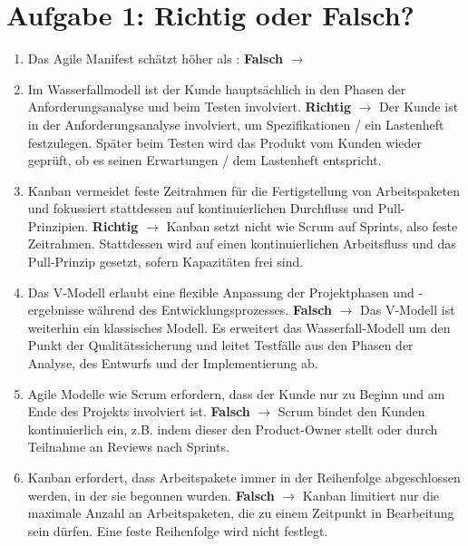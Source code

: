 \section*{Aufgabe 1: Richtig oder Falsch?}

\begin{enumerate}
\item Das Agile Manifest schätzt  höher als
:
\newline \textbf{Falsch} $\rightarrow$ 

\item Im Wasserfallmodell ist der Kunde hauptsächlich in den Phasen
der Anforderungsanalyse und beim Testen involviert.
\newline \textbf{Richtig} $\rightarrow$ Der Kunde ist in der Anforderungsanalyse involviert, um Spezifikationen / ein Lastenheft festzulegen. Später beim Testen wird das Produkt vom Kunden wieder geprüft, ob es seinen Erwartungen / dem Lastenheft entspricht.

\item Kanban vermeidet feste Zeitrahmen für die Fertigstellung von
Arbeitspaketen und fokussiert stattdessen auf kontinuierlichen
Durchfluss und Pull-Prinzipien.
\newline \textbf{Richtig} $\rightarrow$ Kanban setzt nicht wie Scrum auf Sprints, also feste Zeitrahmen. Stattdessen wird auf einen kontinuierlichen Arbeitsfluss und das Pull-Prinzip gesetzt, sofern Kapazitäten frei sind.

\item Das V-Modell erlaubt eine flexible Anpassung der Projektphasen
und -ergebnisse während des Entwicklungsprozesses.
\newline \textbf{Falsch} $\rightarrow$ Das V-Modell ist weiterhin ein klassisches Modell. Es erweitert das Wasserfall-Modell um den Punkt der Qualitätssicherung und leitet Testfälle aus den Phasen der Analyse, des Entwurfs und der Implementierung ab.

\item Agile Modelle wie Scrum erfordern, dass der Kunde nur zu
Beginn und am Ende des Projekts involviert ist.
\newline \textbf{Falsch} $\rightarrow$ Scrum bindet den Kunden kontinuierlich ein, z.B. indem dieser den Product-Owner stellt oder durch Teilnahme an Reviews nach Sprints.

\item Kanban erfordert, dass Arbeitspakete immer in der Reihenfolge
abgeschlossen werden, in der sie begonnen wurden.
\newline \textbf{Falsch} $\rightarrow$ Kanban limitiert nur die maximale Anzahl an Arbeitspaketen, die zu einem Zeitpunkt in Bearbeitung sein dürfen. Eine feste Reihenfolge wird nicht festlegt.

\end{enumerate}

